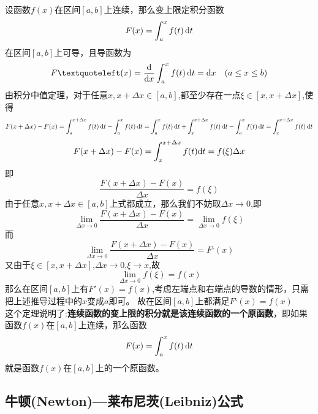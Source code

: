 \theorem[变上限定积分函数的性质]
设函数$f(x)$在区间$[a,b]$上连续，那么变上限定积分函数
\begin{equation}
	\nonumber
	F(x)=\int_{a}^{x}f(t) \,{\rm{d}} t
\end{equation}
在区间$[a,b]$上可导，且导函数为
\begin{equation}
	\nonumber
	F‘(x)=\frac{\d}{\d x}\int_{a}^{x}f(t) \,\d t=\d x  \hspace{1em}(a\leq x\leq b)
\end{equation}
\proof 由积分中值定理，对于任意$x,x+\Delta x\in[a,b]$,都至少存在一点$\xi\in[x,x+\Delta x]$,使得\vspace*{-1em}
\begin{equation}
	\nonumber
	F(x+\Delta x)-F(x)=\int_{a}^{x+\Delta x}f(t)\,{\rm{d}} t-\int_{a}^{x}f(t)\,{\rm{d}} t=\int_{a}^{x}f(t)\,{\rm{d}} t+\int_{x}^{x+\Delta x}f(t)\,{\rm{d}} t-\int_{a}^{x}f(t)\,{\rm{d}} t=\int_{x}^{x+\Delta x}f(t)\,{\rm{d}} t
\end{equation}
\begin{equation}
	\nonumber
	F(x+\Delta x)-F(x)=\int_{x}^{x+\Delta x}f(t){\rm{d}} t=f(\xi)\Delta x
\end{equation}
即
\begin{equation}
	\nonumber
	\frac{F(x+\Delta x)-F(x)}{\Delta x}=f(\xi)
\end{equation}
由于任意$x,x+\Delta x\in[a,b]$上式都成立，那么我们不妨取$\Delta x\to 0$,即
\begin{equation}
	\nonumber
	\lim\limits_{\Delta x\to 0}	\frac{F(x+\Delta x)-F(x)}{\Delta x}=	\lim\limits_{\Delta x \to 0}f(\xi)
	\end{equation}
而
\begin{equation}
	\nonumber
	\lim\limits_{\Delta x\to 0}	\frac{F(x+\Delta x)-F(x)}{\Delta x}=F‘(x)
\end{equation}
又由于$\xi\in[x,x+\Delta x]$,$\Delta x\to0$,$\xi\to x$,故
\begin{equation}
	\nonumber
	\lim\limits_{\Delta x\to 0}f(\xi)=f(x)
\end{equation}
那么在区间$[a,b]$上有$F'(x)=f(x)$,考虑左端点和右端点的导数的情形，只需把上述推导过程中的$x$变成$a$即可。
故在区间$[a,b]$上都满足$F‘(x)=f(x)$
\\
这个定理说明了:\textbf{连续函数的变上限的积分就是该连续函数的一个原函数}，即如果函数$f(x)$在$[a,b]$上连续，那么函数
\begin{equation}
	\nonumber
F(x)=\int_{a}^{x}f(t) \,{\rm{d}} t
\end{equation}
就是函数$f(x)$在$[a,b]$上的一个原函数。
\subsection{牛顿(Newton)—莱布尼茨(Leibniz)公式}

